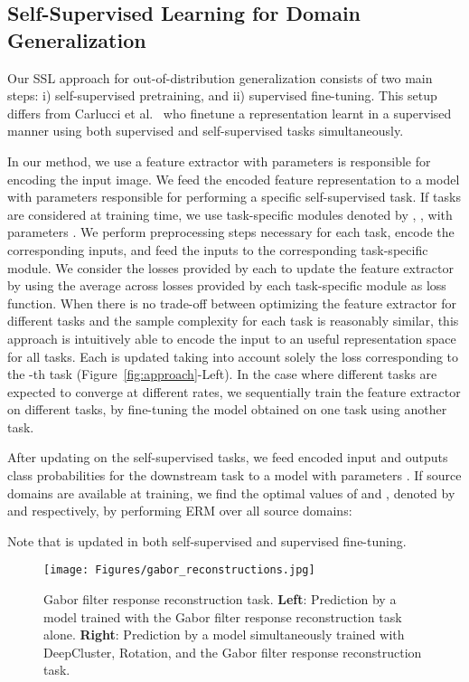 \documentclass[runningheads]{llncs}
\begin{document}
\subsection{Self-Supervised Learning for Domain Generalization}
Our SSL approach for out-of-distribution generalization consists of two main steps: i) self-supervised pretraining, and ii) supervised fine-tuning. This setup differs from Carlucci et al.~\cite{carlucci2019domain} who finetune a representation learnt in a supervised manner using both supervised and self-supervised tasks simultaneously.

In our method, we use a feature extractor  with parameters  is responsible for encoding the input image. We feed the encoded feature representation to a model  with parameters  responsible for performing a specific self-supervised task. If  tasks are considered at training time, we use  task-specific modules denoted by , , with parameters .  We perform preprocessing steps necessary for each task, encode the corresponding inputs, and feed the inputs to the corresponding task-specific module. We consider the  losses provided by each  to update the feature extractor by using the average across losses provided by each task-specific module as loss function. When there is no trade-off between optimizing the feature extractor for different tasks and the sample complexity for each task is reasonably similar, this approach is intuitively able to encode the input to an useful representation space for all tasks. Each  is updated taking into account solely the loss corresponding to the -th task (Figure~\ref{fig:approach}-Left). In the case where different tasks are expected to converge at different rates, we sequentially train the feature extractor on different tasks, by fine-tuning the model obtained on one task using another task. 



After updating  on the self-supervised tasks, we feed encoded input and outputs class probabilities for the downstream task to a model  with parameters . If  source domains are available at training, we find the optimal values of  and , denoted by  and  respectively, by performing ERM over all source domains:\vspace{-5pt}

Note that  is updated in both self-supervised and supervised fine-tuning. 


\begin{figure}[t]
    \centering
    \texttt{[image: Figures/gabor\_reconstructions.jpg]}
    \caption{Gabor filter response reconstruction task. \textbf{Left}: Prediction by a model trained with the Gabor filter response reconstruction task alone.  \textbf{Right}: Prediction by a model simultaneously trained with DeepCluster, Rotation, and the Gabor filter response reconstruction task.} \label{fig:pretext_G}
\end{figure}
\end{document}

